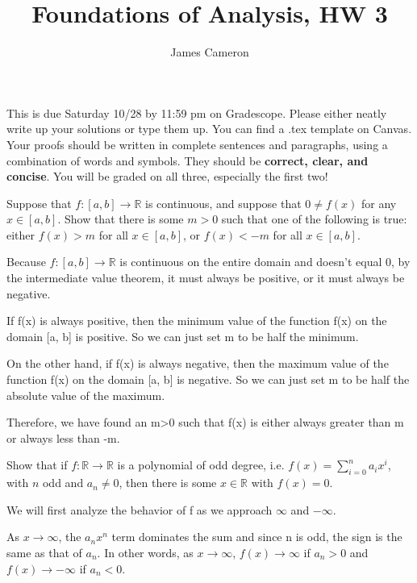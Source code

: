 \documentclass[answers]{exam}
\title{Foundations of Analysis, HW 3}
\author{James Cameron}
\date{}
\theoremstyle{remark}
\theoremstyle{definition}
\newcommand{\RR}{\mathbb{R}}
\begin{document}


 This is due Saturday 10/28 by 11:59 pm on Gradescope. Please either neatly write up your solutions or type them up. You can find a .tex template on Canvas. Your proofs should be written in complete sentences and paragraphs, using a combination of words and symbols. They should be \textbf{correct, clear, and concise}. You will be graded on all three, especially the first two!

\noindent


\begin{questions}

\question Suppose that $f:[a,b] \to \RR$ is continuous, and suppose that $0\not= f(x)$ for any $x \in [a,b]$. Show that there is some $m >0$ such that one of the following is true: either $f(x)>m$ for all $x \in [a,b]$, or $f(x) < -m$ for all $x \in [a,b]$.
\begin{solution}

Because $f : [a, b] \to \RR$ is continuous on the entire domain and doesn't equal 0,
by the intermediate value theorem, it must always be positive,
or it must always be negative.

If f(x) is always positive, then the minimum value
of the function f(x) on the domain [a, b] is positive.
So we can just set m to be half the minimum.

On the other hand, if f(x) is always negative, then the
maximum value of the function f(x) on the domain [a, b] is negative.
So we can just set m to be half the absolute value of the maximum.

Therefore, we have found an m>0 such that
f(x) is either always greater than m or always
less than -m.

\end{solution}

\question Show that if $f: \RR \to \RR$ is a polynomial of odd degree, i.e. $f(x)= \sum_{i=0}^n a_i x^i$, with $n$ odd and $a_n \not=0$, then there is some $x \in \RR$ with $f(x)=0$.
\begin{solution}

We will first analyze the behavior of f as we approach $\infty$
and $-\infty$.

As $x \to \infty$, the $a_n x^n$ term dominates the sum
and since n is odd, the sign is the same as that of
$a_n$. In other words, as $x \to \infty$,
$f(x) \to \infty$ if $a_n > 0$ and $f(x) \to -\infty$
if $a_n < 0$.


\end{solution}
\end{questions}
\end{document}
